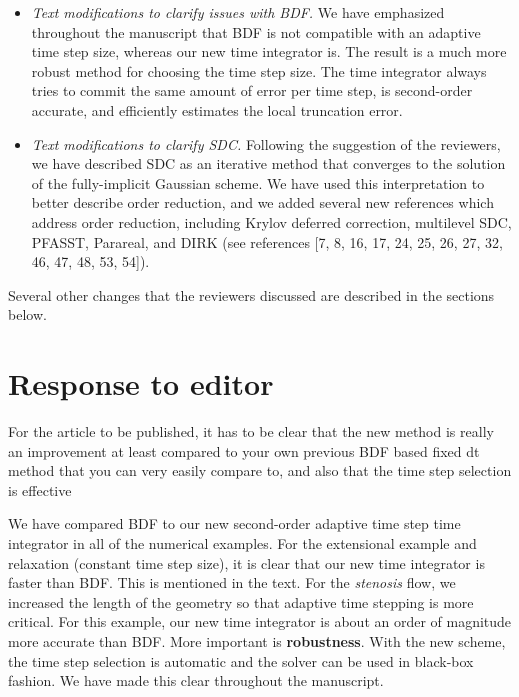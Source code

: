 \documentclass[12pt]{article}
\newcommand{\comment}[1]{{\color{blue} #1}}
\begin{document}
\begin{itemize}
  \item {\em Text modifications to clarify issues with BDF.} We have
  emphasized throughout the manuscript that BDF is not compatible with
  an adaptive time step size, whereas our new time integrator is.  The
  result is a much more robust method for choosing the time step size.
  The time integrator always tries to commit the same amount of error
  per time step, is second-order accurate, and efficiently estimates
  the local truncation error.

  \item {\em Text modifications to clarify SDC.} Following the
  suggestion of the reviewers, we have described SDC as an iterative
  method that converges to the solution of the fully-implicit Gaussian
  scheme.  We have used this interpretation to better describe order
  reduction, and we added several new references which address order
  reduction, including Krylov deferred correction, multilevel SDC,
  PFASST, Parareal, and DIRK (see references [7, 8, 16, 17, 24, 25, 26,
  27, 32, 46, 47, 48, 53, 54]).



\end{itemize}

Several other changes that the reviewers discussed are described in
the sections below.



\section*{Response to editor}
\comment{For the article to be published, it has to be clear that the
new method is really an improvement at least compared to your own
previous BDF based fixed dt method that you can very easily compare to,
and also that the time step selection is effective}

We have compared BDF to our new second-order adaptive time step time
integrator in all of the numerical examples.  For the extensional
example and relaxation (constant time step size), it is clear that our
new time integrator is faster than BDF.  This is mentioned in the
text.  For the {\em stenosis} flow, we increased the length of the
geometry so that adaptive time stepping is more critical.  For this
example, our new time integrator is about an order of magnitude more
accurate than BDF. More important is {\bf robustness}. With the new
scheme, the time step selection is automatic and the solver can be used
in black-box fashion.   We have made this clear throughout the
manuscript.
\end{document}
